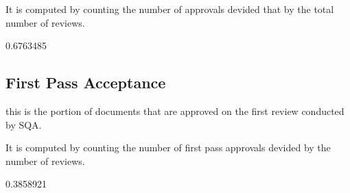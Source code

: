\documentclass{article}
\begin{document}
It is computed by counting the number of approvals devided that by the total number of reviews.

\begin{Schunk}
\begin{Soutput}
[1] 0.6763485
\end{Soutput}
\end{Schunk}

\subsection{First Pass Acceptance}
this is the portion of documents that are approved on the first review conducted
by SQA.

It is computed by counting the number of first pass approvals devided by
the number of reviews.

\begin{Schunk}
\begin{Soutput}
[1] 0.3858921
\end{Soutput}
\end{Schunk}
\end{document}
